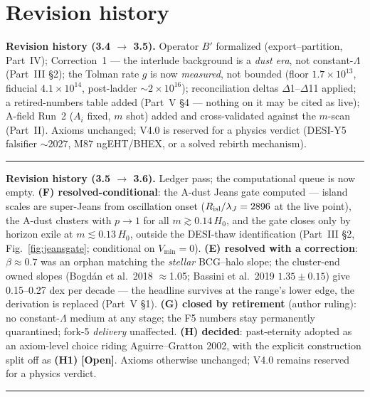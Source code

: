 \documentclass[11pt]{article}
\newcommand{\open}{\textcolor{red!70!black}{\textbf{[Open]}}}
\begin{document}
\clearpage
\part*{Revision history}
{\small
\noindent\textbf{Revision history (3.4 $\to$ 3.5).} Operator $B'$ formalized (export--partition, Part~IV); Correction~1 --- the interlude background is a \emph{dust era}, not constant-$\Lambda$ (Part~III \S2); the Tolman rate $g$ is now \emph{measured}, not bounded (floor $1.7\times10^{13}$, fiducial $4.1\times10^{14}$, post-ladder $\sim$$2\times10^{16}$); reconciliation deltas $\Delta$1--$\Delta$11 applied; a retired-numbers table added (Part~V \S4 --- nothing on it may be cited as live); A-field Run~2 ($A_i$ fixed, $m$ shot) added and cross-validated against the $m$-scan (Part~II). Axioms unchanged; V4.0 is reserved for a physics verdict (DESI-Y5 falsifier $\sim$2027, M87 ngEHT/BHEX, or a solved rebirth mechanism).
\vspace{4pt}\hrule\vspace{4pt}
\noindent\textbf{Revision history (3.5 $\to$ 3.6).} Ledger pass; the computational queue is now empty. \textbf{(F) resolved-conditional}: the A-dust Jeans gate computed --- island scales are super-Jeans from oscillation onset ($R_{\rm isl}/\lambda_J=2896$ at the live point), the A-dust clusters with $p\to1$ for all $m\gtrsim0.14\,H_0$, and the gate closes only by horizon exile at $m\lesssim0.13\,H_0$, outside the DESI-thaw identification (Part~III \S2, Fig.~\ref{fig:jeansgate}; conditional on $V_{\min}=0$). \textbf{(E) resolved with a correction}: $\beta\approx0.7$ was an orphan matching the \emph{stellar} BCG--halo slope; the cluster-end owned slopes (Bogd\'an et al.\ 2018 $\approx$1.05; Bassini et al.\ 2019 $1.35\pm0.15$) give 0.15--0.27 dex per decade --- the headline survives at the range's lower edge, the derivation is replaced (Part~V \S1). \textbf{(G) closed by retirement} (author ruling): no constant-$\Lambda$ medium at any stage; the F5 numbers stay permanently quarantined; fork-5 \emph{delivery} unaffected. \textbf{(H) decided}: past-eternity adopted as an axiom-level choice riding Aguirre--Gratton 2002, with the explicit construction split off as \textbf{(H1)} \open. Axioms otherwise unchanged; V4.0 remains reserved for a physics verdict.
\vspace{4pt}\hrule\vspace{4pt}
$$}
\end{document}
